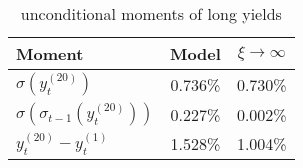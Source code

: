 \begin{table}[htbp]\centering  
 \bgroup  
 \def\arraystretch{1.25}\begin{tabular}{lcc} \hline 
Moment & Model & $\xi \rightarrow \infty$ \\ \hline 
$\sigma(y_t^{(20)})$ & 0.736\% & 0.730\% \\ 
$\sigma(\sigma_{t-1}(y_t^{(20)}))$ & 0.227\% & 0.002\% \\ 
$y_t^{(20)}-y_t^{(1)}$ & 1.528\% & 1.004\% \\ \hline 
\end{tabular} 
 \egroup 
\caption{unconditional moments of long yields} 
\end{table} 
